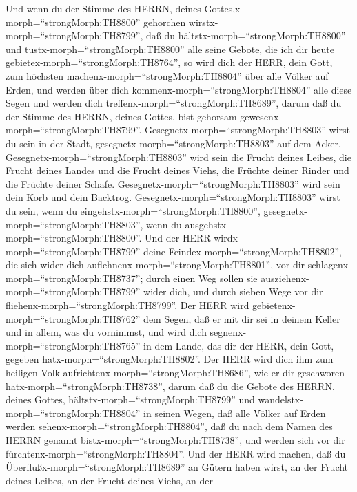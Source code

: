  Und wenn du der Stimme des HERRN, deines
Gottes,x-morph=``strongMorph:TH8800'' gehorchen
wirstx-morph=``strongMorph:TH8799'', daß du
hältstx-morph=``strongMorph:TH8800'' und
tustx-morph=``strongMorph:TH8800'' alle seine Gebote, die ich dir heute
gebietex-morph=``strongMorph:TH8764'', so wird dich der HERR, dein Gott,
zum höchsten machenx-morph=``strongMorph:TH8804'' über alle Völker auf
Erden,  und werden über dich
kommenx-morph=``strongMorph:TH8804'' alle diese Segen und werden dich
treffenx-morph=``strongMorph:TH8689'', darum daß du der Stimme des
HERRN, deines Gottes, bist gehorsam
gewesenx-morph=``strongMorph:TH8799''. 
Gesegnetx-morph=``strongMorph:TH8803'' wirst du sein in der Stadt,
gesegnetx-morph=``strongMorph:TH8803'' auf dem Acker. 
Gesegnetx-morph=``strongMorph:TH8803'' wird sein die Frucht deines
Leibes, die Frucht deines Landes und die Frucht deines Viehs, die
Früchte deiner Rinder und die Früchte deiner Schafe. 
Gesegnetx-morph=``strongMorph:TH8803'' wird sein dein Korb und dein
Backtrog.  Gesegnetx-morph=``strongMorph:TH8803'' wirst du
sein, wenn du eingehstx-morph=``strongMorph:TH8800'',
gesegnetx-morph=``strongMorph:TH8803'', wenn du
ausgehstx-morph=``strongMorph:TH8800''.  Und der HERR
wirdx-morph=``strongMorph:TH8799'' deine
Feindex-morph=``strongMorph:TH8802'', die sich wider dich
auflehnenx-morph=``strongMorph:TH8801'', vor dir
schlagenx-morph=``strongMorph:TH8737''; durch einen Weg sollen sie
ausziehenx-morph=``strongMorph:TH8799'' wider dich, und durch sieben
Wege vor dir fliehenx-morph=``strongMorph:TH8799''.  Der
HERR wird gebietenx-morph=``strongMorph:TH8762'' dem Segen, daß er mit
dir sei in deinem Keller und in allem, was du vornimmst, und wird dich
segnenx-morph=``strongMorph:TH8765'' in dem Lande, das dir der HERR,
dein Gott, gegeben hatx-morph=``strongMorph:TH8802''.  Der
HERR wird dich ihm zum heiligen Volk
aufrichtenx-morph=``strongMorph:TH8686'', wie er dir geschworen
hatx-morph=``strongMorph:TH8738'', darum daß du die Gebote des HERRN,
deines Gottes, hältstx-morph=``strongMorph:TH8799'' und
wandelstx-morph=``strongMorph:TH8804'' in seinen Wegen, 
daß alle Völker auf Erden werden sehenx-morph=``strongMorph:TH8804'',
daß du nach dem Namen des HERRN genannt
bistx-morph=``strongMorph:TH8738'', und werden sich vor dir
fürchtenx-morph=``strongMorph:TH8804''.  Und der HERR wird
machen, daß du Überflußx-morph=``strongMorph:TH8689'' an Gütern haben
wirst, an der Frucht deines Leibes, an der Frucht deines Viehs, an der
